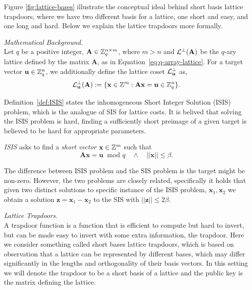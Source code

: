 Figure \ref{fig:lattice-bases} illustrate the conceptual ideal behind short basis lattice trapdoors, where we have two different basis for a lattice, one short and easy, and one long and hard. Below we explain the lattice trapdoors more formally.


\bigskip \noindent \textit{Mathematical Background.} \\ %
Let \(q\) be a positive integer, \(\mathbf A\in\mathbb{Z}_q^{n\times m}\), where \(m>n\) and \(\mathcal{L}^\bot(\mathbf{A})\) be the $q$-ary lattice defined by the matrix \(\mathbf{A}\), as in Equation~\eqref{eq:q-array-lattice}.
For a target vector \(\mathbf u\in\mathbb{Z}_q^n\), we additionally define the lattice coset \(\mathcal{L}_\mathbf{u}^\bot\) as,
\[
\mathcal{L}_\mathbf{u}^\bot (\mathbf{A}) := \{\mathbf x\in\mathbb{Z}^m:
\mathbf A\mathbf x=\mathbf u \in \mathbb{Z}_q^n\}.
\]

Definition~\ref{def:ISIS} states the inhomogeneous Short Integer Solution (ISIS) problem, which is the analogue of SIS for lattice costs. It is belived that solving the ISIS problem is hard, \ie finding a sufficiently short preimage of a given target is believed to be hard for appropriate parameters.


\begin{definition} \label{def:ISIS}
\textit{ISIS} asks to find a \textit{short vector}  \(\mathbf{x}\in \mathbb{Z}^m\) such that 
\[
\mathbf {Ax} = \mathbf{u} \: \text{ mod } q \quad \land \quad ||\mathbf{x}||\leq \beta.\]
\end{definition}

The difference between ISIS problem and the SIS problem is the target might be non-zero. However, the two problems are closely related, specifically  it holds that given two distinct solutions to specific instance of the ISIS problem, \(\mathbf{x}_1,\mathbf{x}_2\) we obtain a solution \(\mathbf{z}= \mathbf{x}_1-\mathbf{x}_2\) to the SIS with \(||\mathbf{z}||\leq 2 \beta\).

\bigskip \noindent \textit{Lattice Trapdoors.} \\
A trapdoor function is a function that is efficient to compute but hard to invert, but can be made easy to invert with some extra information, the trapdoor. Here we consider something called short bases lattice trapdoors, which is based on observation that a lattice can be represented by different bases, which may differ significantly in the lengths and orthogonality of their basis vectors. In this setting we will denote the trapdoor to be a short basis of a lattice and the public key is the matrix defining the lattice.

